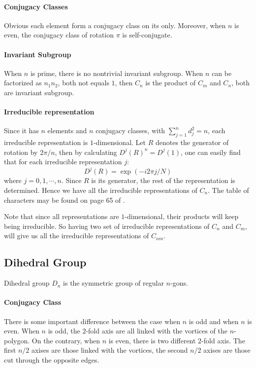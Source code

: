 \paragraph{Conjugacy Classes} Obvious each element form a conjugacy
class on its only. Moreover, when $n$ is even, the conjugacy class of
rotation $\pi$ is self-conjugate.

\paragraph{Invariant Subgroup} When $n$ is prime, there is no
nontrivial invariant subgroup. When $n$ can be factorized as $n_1n_2$,
both not equals $1$, then $C_n$ is the product of $C_m$ and $C_n$,
both are invariant subgroup.

\paragraph{Irreducible representation} Since it has $n$ elements and
$n$ conjugacy classes, with $\sum_{j=1}^n d_j^2 = n$, each irreducible
representation is $1$-dimensional. Let $R$ denotes the generator of
rotation by $2\pi/n$, then by calculating $D^j(R)^n=D^j(1)$, one can
easily find that for each irreducible representation $j$:
\begin{equation}
    D^j(R) = \exp(-i2\pi j/N)
\end{equation}
where $j=0,1,\cdots, n$. Since $R$ is its generator, the rest of the
representation is determined. Hence we have all the irreducible
representations of $C_n$. The table of characters may be found on page
65 of \cite{book}.

Note that since all representations are $1$-dimensional, their
products will keep being irreducible. So having two set of irreducible
representations of $C_n$ and $C_m$, will give us all the irreducible
representations of $C_{nm}$.
\subsection{Dihedral Group}
\label{sec:Dihedral-Group}
\begin{defi}
    Dihedral group $D_n$ is the symmetric group of regular $n$-gons.
\end{defi}

\paragraph{Conjugacy Class}
There is some important difference between the case when $n$ is odd
and when $n$ is even. When $n$ is odd, the $2$-fold axis are all
linked with the vortices of the $n$-polygon. On the contrary, when $n$
is even, there is two different $2$-fold axis. The first $n/2$ axises
are those linked with the vortices, the second $n/2$ axises are those
cut through the opposite edges. 


